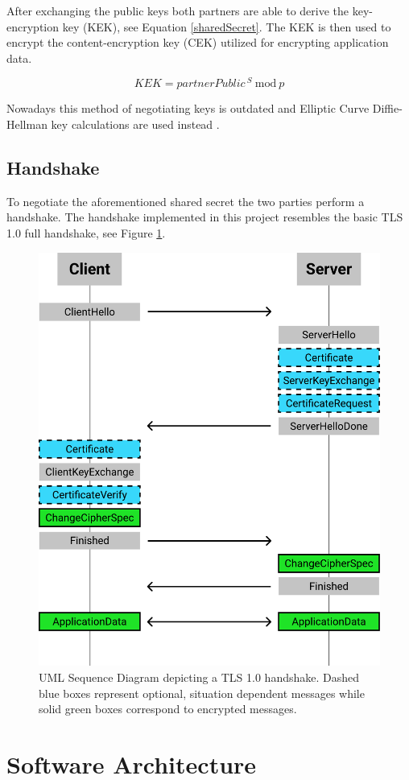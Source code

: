 \documentclass[12pt, letterpaper]{article}
\begin{document}
 After exchanging the public keys both partners are able to derive the key-encryption key (KEK), see Equation \ref{sharedSecret}. The KEK is then used to encrypt the content-encryption key (CEK) utilized for encrypting application data.

\begin{equation}\label{sharedSecret}
	KEK = partnerPublic^{\ S}\ \mathrm{mod}\ p
\end{equation}
 

Nowadays this method of negotiating keys is outdated and Elliptic Curve Diffie-Hellman key calculations are used instead \cite{jablon2001ieee}.

\subsection{Handshake}
To negotiate the aforementioned shared secret the two parties perform a handshake. The handshake implemented in this project resembles the basic TLS 1.0 full handshake, see Figure \ref{fig:handshake}.

\begin{figure}[H]
	\centering
	\includegraphics[width=.6\textwidth]{Handshake}
	\caption{UML Sequence Diagram depicting a TLS 1.0 handshake. Dashed blue boxes represent optional, situation dependent messages while solid green boxes correspond to encrypted messages. \cite{dierks1999rfc2246}}
	\label{fig:handshake}
\end{figure}

\section{Software Architecture}
\end{document}
